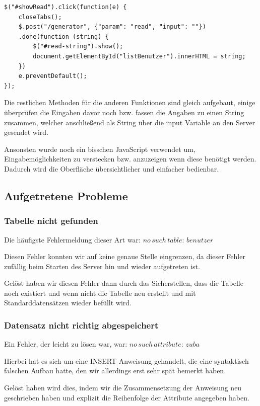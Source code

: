 \begin{lstlisting}[language=HTML, caption=Anfrage senden an den Server]
$("#showRead").click(function(e) {
	closeTabs();
	$.post("/generator", {"param": "read", "input": ""})
	.done(function (string) {
		$("#read-string").show();
		document.getElementById("listBenutzer").innerHTML = string;
	})
	e.preventDefault();
});
\end{lstlisting}

Die restlichen Methoden für die anderen Funktionen sind gleich aufgebaut, einige überprüfen die Eingaben davor noch bzw. fassen die Angaben zu einen String zusammen, welcher anschließend als String über die input Variable an den Server gesendet wird.

Ansonsten wurde noch ein bisschen JavaScript verwendet um, Eingabemöglichkeiten zu verstecken bzw. anzuzeigen wenn diese benötigt werden. Dadurch wird die Oberfläche übersichtlicher und einfacher bedienbar.

\subsection{Aufgetretene Probleme}

\subsubsection{Tabelle nicht gefunden}
Die häufigste Fehlermeldung dieser Art war: $ no\,such\,table:\,benutzer $ 

Diesen Fehler konnten wir auf keine genaue Stelle eingrenzen, da dieser Fehler zufällig beim Starten des Server hin und wieder aufgetreten ist. 

Gelöst haben wir diesen Fehler dann durch das Sicherstellen, dass die Tabelle noch existiert und wenn nicht die Tabelle neu erstellt und mit Standarddatensätzen wieder befüllt wird.

\subsubsection{Datensatz nicht richtig abgespeichert}
Ein Fehler, der leicht zu lösen war, war: $ no\,such\,attribute:\,zuba $ 

Hierbei hat es sich um eine INSERT Anweisung gehandelt, die eine syntaktisch falschen Aufbau hatte, den wir allerdings erst sehr spät bemerkt haben. 

Gelöst haben wird dies, indem wir die Zusammensetzung der Anweisung neu geschrieben haben und explizit die Reihenfolge der Attribute angegeben haben.

